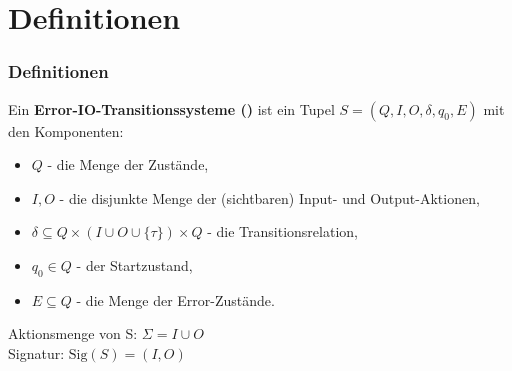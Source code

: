 \section{Definitionen}
\begin{frame}
  \frametitle{Definitionen}
  \begin{Def}
    Ein \textbf{Error-IO-Transitionssysteme (\EIO{})} ist ein Tupel $S=(Q,I,O,\delta
    ,q_0,E)$ mit den Komponenten:
    \begin{itemize}
      \item $Q$ - die Menge der Zustände,
      \item $I,O$ - die disjunkte Menge der (sichtbaren) Input- und
        Output-Aktionen,
      \item $\delta\subseteq Q\times (I\cup O\cup \{\tau\})\times Q$ - die
        Transitionsrelation,
      \item $q_0\in Q$ - der Startzustand,
      \item $E\subseteq Q$ - die Menge der Error-Zustände.
    \end{itemize}
    Aktionsmenge von S: $\Sigma = I\cup O$\\
    Signatur: $\mathrm{Sig}(S)= (I,O)$
  \end{Def}
\end{frame}

